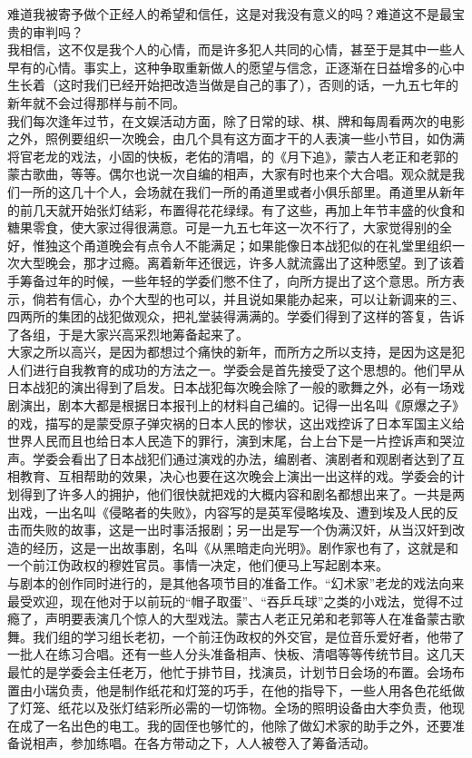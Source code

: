 难道我被寄予做个正经人的希望和信任，这是对我没有意义的吗？难道这不是最宝贵的审判吗？\\

我相信，这不仅是我个人的心情，而是许多犯人共同的心情，甚至于是其中一些人早有的心情。事实上，这种争取重新做人的愿望与信念，正逐渐在日益增多的心中生长着（这时我们已经开始把改造当做是自己的事了），否则的话，一九五七年的新年就不会过得那样与前不同。\\

我们每次逢年过节，在文娱活动方面，除了日常的球、棋、牌和每周看两次的电影之外，照例要组织一次晚会，由几个具有这方面才干的人表演一些小节目，如伪满将官老龙的戏法，小固的快板，老佑的清唱，的《月下追》，蒙古人老正和老郭的蒙古歌曲，等等。偶尔也说一次自编的相声，大家有时也来个大合唱。观众就是我们一所的这几十个人，会场就在我们一所的甬道里或者小俱乐部里。甬道里从新年的前几天就开始张灯结彩，布置得花花绿绿。有了这些，再加上年节丰盛的伙食和糖果零食，使大家过得很满意。可是一九五七年这一次不行了，大家觉得别的全好，惟独这个甬道晚会有点令人不能满足；如果能像日本战犯似的在礼堂里组织一次大型晚会，那才过瘾。离着新年还很远，许多人就流露出了这种愿望。到了该着手筹备过年的时候，一些年轻的学委们憋不住了，向所方提出了这个意思。所方表示，倘若有信心，办个大型的也可以，并且说如果能办起来，可以让新调来的三、四两所的集团的战犯做观众，把礼堂装得满满的。学委们得到了这样的答复，告诉了各组，于是大家兴高采烈地筹备起来了。\\

大家之所以高兴，是因为都想过个痛快的新年，而所方之所以支持，是因为这是犯人们进行自我教育的成功的方法之一。学委会是首先接受了这个思想的。他们早从日本战犯的演出得到了启发。日本战犯每次晚会除了一般的歌舞之外，必有一场戏剧演出，剧本大都是根据日本报刊上的材料自己编的。记得一出名叫《原爆之子》的戏，描写的是蒙受原子弹灾祸的日本人民的惨状，这出戏控诉了日本军国主义给世界人民而且也给日本人民造下的罪行，演到末尾，台上台下是一片控诉声和哭泣声。学委会看出了日本战犯们通过演戏的办法，编剧者、演剧者和观剧者达到了互相教育、互相帮助的效果，决心也要在这次晚会上演出一出这样的戏。学委会的计划得到了许多人的拥护，他们很快就把戏的大概内容和剧名都想出来了。一共是两出戏，一出名叫《侵略者的失败》，内容写的是英军侵略埃及、遭到埃及人民的反击而失败的故事，这是一出时事活报剧；另一出是写一个伪满汉奸，从当汉奸到改造的经历，这是一出故事剧，名叫《从黑暗走向光明》。剧作家也有了，这就是和一个前江伪政权的穆姓官员。事情一决定，他们便马上写起剧本来。\\

与剧本的创作同时进行的，是其他各项节目的准备工作。“幻术家”老龙的戏法向来最受欢迎，现在他对于以前玩的“帽子取蛋”、“吞乒乓球”之类的小戏法，觉得不过瘾了，声明要表演几个惊人的大型戏法。蒙古人老正兄弟和老郭等人在准备蒙古歌舞。我们组的学习组长老初，一个前汪伪政权的外交官，是位音乐爱好者，他带了一批人在练习合唱。还有一些人分头准备相声、快板、清唱等等传统节目。这几天最忙的是学委会主任老万，他忙于排节目，找演员，计划节日会场的布置。会场布置由小瑞负责，他是制作纸花和灯笼的巧手，在他的指导下，一些人用各色花纸做了灯笼、纸花以及张灯结彩所必需的一切饰物。全场的照明设备由大李负责，他现在成了一名出色的电工。我的固侄也够忙的，他除了做幻术家的助手之外，还要准备说相声，参加练唱。在各方带动之下，人人被卷入了筹备活动。\\


